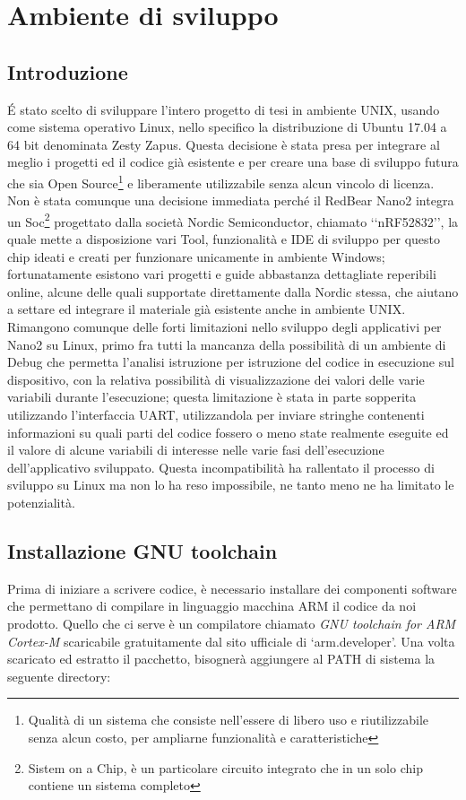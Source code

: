 
\section{Ambiente di sviluppo}
\subsection{Introduzione}
\'E stato scelto di sviluppare l'intero progetto di tesi in ambiente UNIX, usando come sistema operativo Linux, nello specifico la distribuzione di Ubuntu 17.04 a 64 bit denominata Zesty Zapus. Questa decisione è stata presa per integrare al meglio i progetti ed il codice già esistente e per creare una base di sviluppo futura che sia Open Source\footnote{Qualità di un sistema che consiste nell'essere di libero uso e riutilizzabile senza alcun costo, per ampliarne funzionalità e caratteristiche} e liberamente utilizzabile senza alcun vincolo di licenza. Non è stata comunque una decisione immediata perché il RedBear Nano2 integra un Soc\footnote{Sistem on a Chip, è un particolare circuito integrato che in un solo chip contiene un sistema completo} progettato dalla società Nordic Semiconductor, chiamato \lq\lq nRF52832\rq\rq, la quale mette a disposizione vari Tool, funzionalità e IDE di sviluppo per questo chip ideati e creati  per funzionare unicamente in ambiente Windows; fortunatamente esistono vari progetti e guide abbastanza dettagliate reperibili online, alcune delle quali supportate direttamente dalla Nordic stessa, che aiutano a settare ed integrare il materiale già esistente anche in ambiente UNIX.
Rimangono comunque delle forti limitazioni nello sviluppo degli applicativi per Nano2 su Linux, primo fra tutti la mancanza della possibilità di un ambiente di Debug che permetta l'analisi istruzione per istruzione del codice in esecuzione sul dispositivo, con la relativa possibilità di visualizzazione dei valori delle varie variabili durante l'esecuzione; questa limitazione è stata in parte sopperita utilizzando l'interfaccia UART, utilizzandola per inviare stringhe contenenti informazioni su quali parti del codice fossero o meno state realmente eseguite ed il valore di alcune variabili di interesse nelle varie fasi dell'esecuzione dell'applicativo sviluppato. 
Questa incompatibilità ha rallentato il processo di sviluppo su Linux ma non lo ha reso impossibile, ne tanto meno ne ha limitato le potenzialità.

\subsection{Installazione GNU toolchain}\label{inst_gnu_toolchain}
Prima di iniziare a scrivere codice, è necessario installare dei componenti software che permettano di compilare in linguaggio macchina ARM il codice da noi prodotto.
Quello che ci serve è un compilatore chiamato \emph{GNU toolchain for ARM Cortex-M} scaricabile gratuitamente dal sito ufficiale di \lq arm.developer\rq. \cite{armweb} Una volta scaricato ed estratto il pacchetto, bisognerà aggiungere al PATH di sistema la seguente directory:

